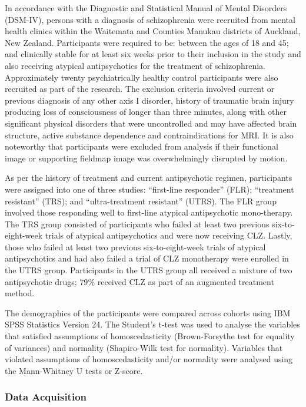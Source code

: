 In accordance with the Diagnostic and Statistical Manual of Mental Disorders (DSM-IV), persons with a diagnosis of schizophrenia were recruited from mental health clinics within the Waitemata and Counties Manukau districts of Auckland, New Zealand. Participants were required to be: between the ages of 18 and 45; and clinically stable for at least six weeks prior to their inclusion in the study and also receiving atypical antipsychotics for the treatment of schizophrenia. Approximately twenty psychiatrically healthy control participants were also recruited as part of the research. The exclusion criteria involved current or previous diagnosis of any other axis I disorder, history of traumatic brain injury producing loss of consciousness of longer than three minutes, along with other significant physical disorders that were uncontrolled and may have affected brain structure, active substance dependence and contraindications for MRI. It is also noteworthy that participants were excluded from analysis if their functional image or supporting fieldmap image was overwhelmingly disrupted by motion. 

As per the history of treatment and current antipsychotic regimen, participants were assigned into one of three studies: “first-line responder” (FLR); “treatment resistant” (TRS); and “ultra-treatment resistant” (UTRS). The FLR group involved those responding well to first-line atypical antipsychotic mono-therapy. The TRS group consisted of participants who failed at least two previous six-to-eight-week trials of atypical antipsychotics and were now receiving CLZ. Lastly, those who failed at least two previous six-to-eight-week trials of atypical antipsychotics and had also failed a trial of CLZ monotherapy were enrolled in the UTRS group. Participants in the UTRS group all received a mixture of two antipsychotic drugs; $79\%$ received CLZ as part of an augmented treatment method.

The demographics of the participants were compared across cohorts using IBM SPSS Statistics Version 24. The Student’s t-test was used to analyse the variables that satisfied assumptions of homoscedasticity (Brown-Forsythe test for equality of variances) and normality (Shapiro-Wilk test for normality). Variables that violated assumptions of homoscedasticity and/or normality were analysed using the Mann-Whitney U tests or Z-score.


\subsubsection{Data Acquisition}

